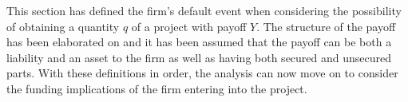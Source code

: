 \documentclass[../main.tex]{subfiles}
\begin{document}
        This section has defined the firm's default event when considering the possibility
        of obtaining a quantity $q$ of a project with payoff $Y$.
        The structure of the payoff has been elaborated on
        and it has been assumed that the payoff can be both a liability and an asset to the firm
        as well as having both secured and unsecured parts.
        With these definitions in order, the analysis can now move on to consider the
        funding implications of the firm entering into the project.
        
\end{document}
